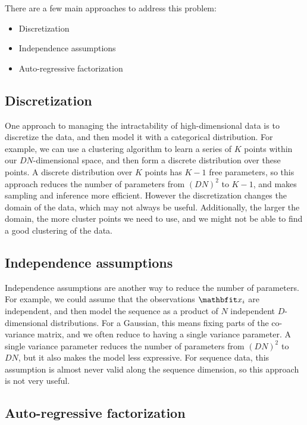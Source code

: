 There are a few main approaches to address this problem:
\begin{itemize}
    \item Discretization
    \item Independence assumptions
    \item Auto-regressive factorization
\end{itemize}

\subsection{Discretization}

One approach to managing the intractability of high-dimensional data is to discretize the data, and then model it with a categorical distribution. For example, we can use a clustering algorithm to learn a series of $K$ points within our $DN$-dimensional space, and then form a discrete distribution over these points. A discrete distribution over $K$ points has $K-1$ free parameters, so this approach reduces the number of parameters from $(DN)^2$ to $K-1$, and makes sampling and inference more efficient. However the discretization changes the domain of the data, which may not always be useful. Additionally, the larger the domain, the more cluster points we need to use, and we might not be able to find a good clustering of the data.

\subsection{Independence assumptions}

Independence assumptions are another way to reduce the number of parameters. For example, we could assume that the observations $\x_i$ are independent, and then model the sequence as a product of $N$ independent $D$-dimensional distributions. For a Gaussian, this means fixing parts of the co-variance matrix, and we often reduce to having a single variance parameter. A single variance parameter reduces the number of parameters from $(DN)^2$ to $DN$, but it also makes the model less expressive. For sequence data, this assumption is almost never valid along the sequence dimension, so this approach is not very useful.

\subsection{Auto-regressive factorization}
\label{ss:ar-factorization}

